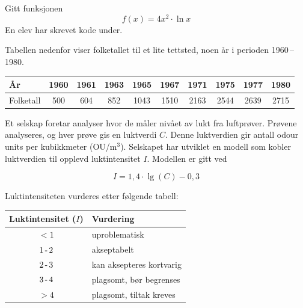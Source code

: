 \newpage
{}
Gitt funksjonen
\[ f(x)=4x^2\cdot \ln x \]
En elev har skrevet kode under.

\newpage
{}
Tabellen nedenfor viser folketallet til et lite tettsted, noen år i
perioden 1960\,--\,1980.

\begin{center}
	\small	
	\begin{tabular}{|l|c|c|c|c|c|c|c|c|c|}
		\hline
		År & 1960 & 1961 & 1963 & 1965 & 1967 & 1971 & 1975 & 1977 & 1980 \\
		\hline
		Folketall & 500 & 604 & 852 & 1043 & 1510 & 2163 & 2544 & 2639 & 2715 \\
		\hline
	\end{tabular}
\end{center}



Et selskap foretar analyser hvor de måler nivået av lukt fra luftprøver.
Prøvene analyseres, og hver prøve gis en luktverdi $C$. Denne luktverdien gir antall odour units per kubikkmeter (OU/$\text{m}^3$). Selskapet har utviklet en modell som kobler luktverdien til opplevd luktintensitet $I$. Modellen er gitt ved

\begin{equation*}
	I = 1,4 \cdot \lg(C) - 0,3
\end{equation*}

Luktintensiteten vurderes etter følgende tabell:

\begin{center}
	\begin{tabular}{c l}
		\hline
		\textbf{Luktintensitet ($I$)} & \textbf{Vurdering} \\
		\hline
		$< 1$   & uproblematisk \\
		$1\text{\,-\,}2$ & akseptabelt \\
		$2\text{\,-\,}3$ & kan aksepteres kortvarig \\
		$3\text{\,-\,}4$ & plagsomt, bør begrenses \\
		$> 4$   & plagsomt, tiltak kreves \\
		\hline
	\end{tabular}
\end{center}

